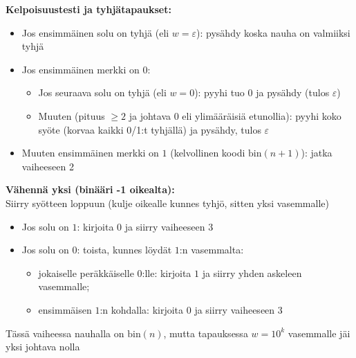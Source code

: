 \documentclass[12pt,a4paper]{article}
\begin{document}
\medskip
\begin{alakohta}

\item{\bf Kelpoisuustesti ja tyhjätapaukset:}
\begin{itemize}
  \item Jos ensimmäinen solu on tyhjä (eli $w=\varepsilon$): pysähdy koska nauha on valmiiksi tyhjä
  \item Jos ensimmäinen merkki on $0$:
    \begin{itemize}
      \item Jos seuraava solu on tyhjä (eli $w=0$): pyyhi tuo $0$ ja pysähdy (tulos $\varepsilon$)
      \item Muuten (pituus $\ge 2$ ja johtava $0$ eli ylimääräisiä etunollia): pyyhi koko syöte (korvaa kaikki 0/1:t tyhjällä) ja pysähdy, tulos $\varepsilon$
    \end{itemize}
  \item Muuten ensimmäinen merkki on $1$ (kelvollinen koodi $\mathrm{bin}(n{+}1)$): jatka vaiheeseen 2 
\end{itemize}

\item{\bf Vähennä yksi (binääri -1 oikealta):}\\
Siirry syötteen loppuun (kulje oikealle kunnes tyhjö, sitten yksi vasemmalle)
\begin{itemize}
  \item Jos solu on $1$: kirjoita $0$ ja siirry vaiheeseen 3
  \item Jos solu on $0$: toista, kunnes löydät $1$:n vasemmalta:
    \begin{itemize}
      \item jokaiselle peräkkäiselle $0$:lle: kirjoita $1$ ja siirry yhden askeleen vasemmalle;
      \item ensimmäisen $1$:n kohdalla: kirjoita $0$ ja siirry vaiheeseen 3
    \end{itemize}
\end{itemize}
Tässä vaiheessa nauhalla on $\mathrm{bin}(n)$, mutta
tapauksessa $w=10^k$ vasemmalle jäi yksi johtava nolla


\end{alakohta}
\end{document}
